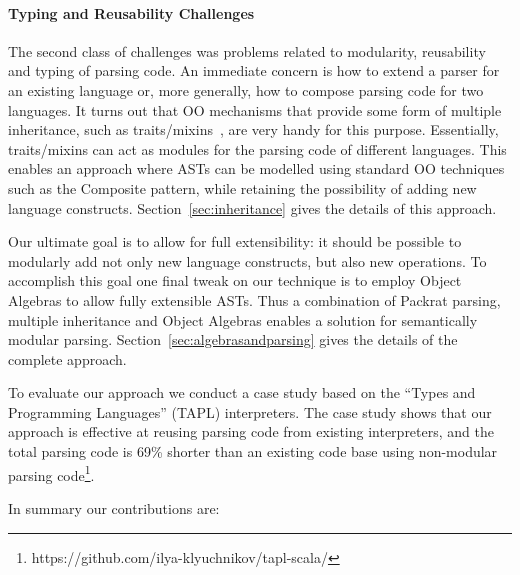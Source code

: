 \paragraph{Typing and Reusability Challenges} The second class of
challenges was problems related to modularity, reusability and
typing of parsing code. An immediate concern is how to extend a
parser for an existing language or, more generally, how to compose
parsing code for two languages. It turns out that OO mechanisms that
provide some form of multiple inheritance,
such as traits/mixins~\cite{Bracha1990,Scharli2003}, are very handy for this
purpose. Essentially, traits/mixins can act as modules for the parsing code
of different languages. This enables an approach where ASTs can be
modelled using standard OO techniques such as the {\sc Composite}
pattern, while retaining the possibility of adding new language
constructs. Section~\ref{sec:inheritance} gives the details of this approach.

Our ultimate goal is to allow for full extensibility: it should be
possible to modularly add not only new language constructs, but
also new operations. To accomplish this goal one final tweak on our
technique is to employ Object Algebras to allow fully extensible
ASTs. Thus a combination of Packrat parsing, multiple inheritance
and Object Algebras enables a solution for semantically modular
parsing. Section~\ref{sec:algebrasandparsing} gives the details of the complete approach.

To evaluate our approach we conduct a case study based on the ``Types
and Programming Languages'' (TAPL) interpreters. The case study shows
that our approach is effective at reusing parsing code from existing
interpreters, and the total parsing code is 69\% shorter than an
existing code base using non-modular parsing code\footnote{https://github.com/ilya-klyuchnikov/tapl-scala/}.

In summary our contributions are:

